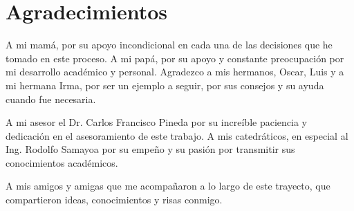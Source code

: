 \chapter*{Agradecimientos}

 A mi mamá, por su apoyo incondicional en cada una de las decisiones que he tomado en este proceso. A  mi papá, por su apoyo y constante preocupación por mi desarrollo académico y personal. Agradezco a mis hermanos, Oscar, Luis y a mi hermana Irma, por ser un ejemplo a seguir, por sus consejos y su ayuda cuando fue necesaria.

 A mi asesor el Dr\@. Carlos Francisco Pineda por su increíble paciencia y dedicación en el asesoramiento de este trabajo. A mis catedráticos, en especial al Ing. Rodolfo Samayoa por su empeño y su pasión por transmitir sus conocimientos académicos. 

 A mis amigos y amigas que me acompañaron a lo largo de este trayecto, que compartieron ideas, conocimientos y risas conmigo.  

\newpage
